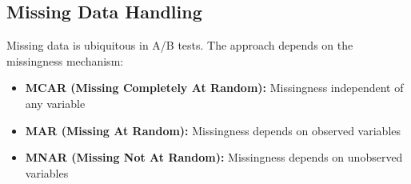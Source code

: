 \subsection{Missing Data Handling}

Missing data is ubiquitous in A/B tests. The approach depends on the missingness mechanism:

\begin{itemize}
    \item \textbf{MCAR (Missing Completely At Random):} Missingness independent of any variable
    \item \textbf{MAR (Missing At Random):} Missingness depends on observed variables
    \item \textbf{MNAR (Missing Not At Random):} Missingness depends on unobserved variables
\end{itemize}

